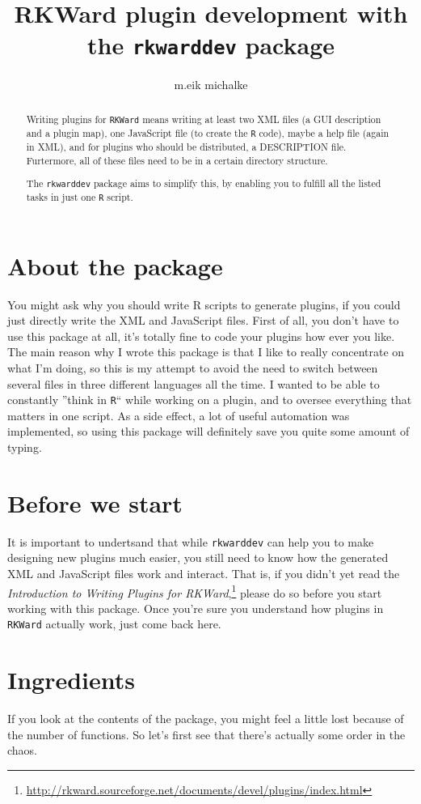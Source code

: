 \documentclass[a4paper,10pt]{scrartcl}
\title{RKWard plugin development with the \texttt{rkwarddev} package}
\author{m.eik michalke}
\begin{document}
\maketitle

\begin{abstract}
Writing plugins for \texttt{RKWard} means writing at least two XML files (a GUI description and a plugin map),
one JavaScript file (to create the  \texttt{R} code), maybe a help file (again in XML), and for plugins who
should be distributed, a DESCRIPTION file. Furtermore, all of these files need to be in a certain directory
structure.

The  \texttt{rkwarddev} package aims to simplify this, by enabling you to fulfill all the listed tasks in just
one  \texttt{R} script.
\end{abstract}

\section{About the package}
You might ask why you should write R scripts to generate plugins, if you could just directly write the XML
and JavaScript files. First of all, you don't have to use this package at all, it's totally fine to code your
plugins how ever you like. The main reason why I wrote this package is that I like to really concentrate on
what I'm doing, so this is my attempt to avoid the need to switch between several files in three different languages all the
time. I wanted to be able to constantly ''think in  \texttt{R}`` while working on a plugin, and to oversee everything
that matters in one script. As a side effect, a lot of useful automation was implemented, so using this package
will definitely save you quite some amount of typing.

\section{Before we start}
It is important to undertsand that while  \texttt{rkwarddev} can help you to make designing new plugins
much easier, you still need to know how the generated XML and JavaScript files work and interact. That is, if
you didn't yet read the \textit{Introduction to Writing Plugins for
RKWard},\footnote{\url{http://rkward.sourceforge.net/documents/devel/plugins/index.html}} please do so before
you start working with this package. Once you're sure you understand how plugins in \texttt{RKWard} actually
work, just come back here.

\section{Ingredients}
If you look at the contents of the package, you might feel a little lost because of the number of functions.
So let's first see that there's actually some order in the chaos.
\end{document}
